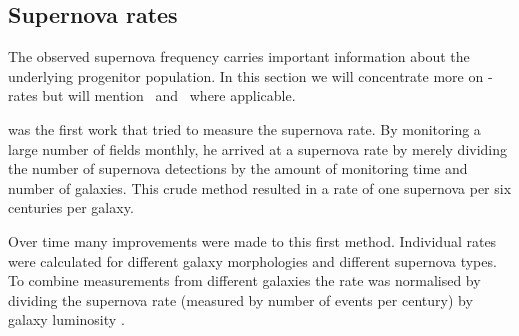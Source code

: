 \subsection{Supernova rates}
\label{sec:sn_rates}
The observed supernova frequency carries important information about the underlying progenitor population. In this section we will concentrate more on \sneia-rates but will mention \sneii\ and \sneibc\ where applicable.

\citet{1938ApJ....88..529Z} was the first work that tried to measure the supernova rate. By monitoring a large number of fields monthly, he arrived at a supernova rate by merely dividing the number of supernova detections by the amount of monitoring time and number of galaxies. This crude method resulted in a rate of one supernova per six centuries per galaxy. 

Over time many improvements were made to this first method. Individual rates were calculated for different galaxy morphologies and different supernova types. To combine measurements from different galaxies the rate was normalised by dividing the supernova rate (measured by number of events per century) by galaxy luminosity \citep[e.g.][]{1991ARA&A..29..363V,1994ApJS...92..487T}. 

